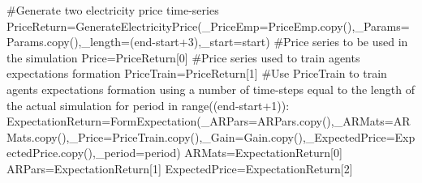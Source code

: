 \documentclass[
  letterpaper,
  DIV=11,
  numbers=noendperiod]{scrartcl}
\newenvironment{Shaded}{\begin{snugshade}}{\end{snugshade}}
\newcommand{\BuiltInTok}[1]{\textcolor[rgb]{0.00,0.23,0.31}{#1}}
\newcommand{\CommentTok}[1]{\textcolor[rgb]{0.37,0.37,0.37}{#1}}
\newcommand{\ControlFlowTok}[1]{\textcolor[rgb]{0.00,0.23,0.31}{#1}}
\newcommand{\DecValTok}[1]{\textcolor[rgb]{0.68,0.00,0.00}{#1}}
\newcommand{\KeywordTok}[1]{\textcolor[rgb]{0.00,0.23,0.31}{#1}}
\newcommand{\NormalTok}[1]{\textcolor[rgb]{0.00,0.23,0.31}{#1}}
\newcommand{\OperatorTok}[1]{\textcolor[rgb]{0.37,0.37,0.37}{#1}}
\begin{document}
\begin{Shaded}
\begin{Highlighting}[]
    \CommentTok{\#Generate two electricity price time{-}series}
\NormalTok{    PriceReturn}\OperatorTok{=}\NormalTok{GenerateElectricityPrice(\_PriceEmp}\OperatorTok{=}\NormalTok{PriceEmp.copy(),\_Params}\OperatorTok{=}\NormalTok{Params.copy(),\_length}\OperatorTok{=}\NormalTok{(end}\OperatorTok{{-}}\NormalTok{start}\OperatorTok{+}\DecValTok{3}\NormalTok{),\_start}\OperatorTok{=}\NormalTok{start)}
    \CommentTok{\#Price series to be used in the simulation}
\NormalTok{    Price}\OperatorTok{=}\NormalTok{PriceReturn[}\DecValTok{0}\NormalTok{]}
    \CommentTok{\#Price series used to train agents\textquotesingle{} expectations formation}
\NormalTok{    PriceTrain}\OperatorTok{=}\NormalTok{PriceReturn[}\DecValTok{1}\NormalTok{]}
    \CommentTok{\#Use PriceTrain to train agents\textquotesingle{} expectations formation using a number of time{-}steps equal to the length of the actual simulation}
    \ControlFlowTok{for}\NormalTok{ period }\KeywordTok{in} \BuiltInTok{range}\NormalTok{((end}\OperatorTok{{-}}\NormalTok{start}\OperatorTok{+}\DecValTok{1}\NormalTok{)):}
\NormalTok{        ExpectationReturn}\OperatorTok{=}\NormalTok{FormExpectation(\_ARPars}\OperatorTok{=}\NormalTok{ARPars.copy(),\_ARMats}\OperatorTok{=}\NormalTok{ARMats.copy(),\_Price}\OperatorTok{=}\NormalTok{PriceTrain.copy(),\_Gain}\OperatorTok{=}\NormalTok{Gain.copy(),\_ExpectedPrice}\OperatorTok{=}\NormalTok{ExpectedPrice.copy(),\_period}\OperatorTok{=}\NormalTok{period)}
\NormalTok{        ARMats}\OperatorTok{=}\NormalTok{ExpectationReturn[}\DecValTok{0}\NormalTok{]}
\NormalTok{        ARPars}\OperatorTok{=}\NormalTok{ExpectationReturn[}\DecValTok{1}\NormalTok{]}
\NormalTok{        ExpectedPrice}\OperatorTok{=}\NormalTok{ExpectationReturn[}\DecValTok{2}\NormalTok{]}
    

\end{Highlighting}
\end{Shaded}
\end{document}
